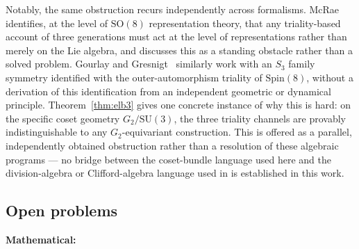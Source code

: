 \documentclass[12pt,a4paper]{article}
\begin{document}
Notably, the same obstruction recurs independently across formalisms. McRae~\cite{McRae2025}
identifies, at the level of $\mathrm{SO}(8)$ representation theory, that any triality-based
account of three generations must act at the level of representations rather than merely on
the Lie algebra, and discusses this as a standing obstacle rather than a solved problem.
Gourlay and Gresnigt~\cite{GourlayGresnigt2024} similarly work with an $S_3$ family symmetry
identified with the outer-automorphism triality of $\mathrm{Spin}(8)$, without a derivation of
this identification from an independent geometric or dynamical principle. Theorem~\ref{thm:elb3}
gives one concrete instance of why this is hard: on the specific coset geometry $G_2/\mathrm{SU}(3)$,
the three triality channels are provably indistinguishable to any $G_2$-equivariant construction.
This is offered as a parallel, independently obtained obstruction rather than a resolution of
these algebraic programs --- no bridge between the coset-bundle language used here and the
division-algebra or Clifford-algebra language used in
\cite{FureyHughes2024,GillardGresnigt2019,McRae2025,GourlayGresnigt2024} is established in this
work.

\subsection{Open problems}
\label{sec:open}

\textbf{Mathematical:}
\end{document}
